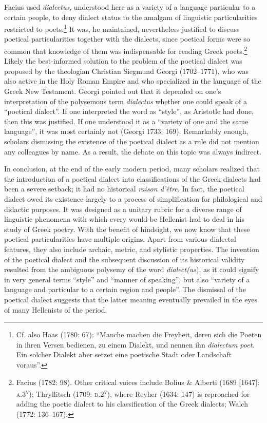 \begin{styleStandard}
Facius used \textit{dialectus}, understood here\textit{ }as\textsc{ }a variety of a language particular to a certain people, to deny dialect status to the amalgam of linguistic particularities restricted to poets.\footnote{ Cf. also Haas (1780: 67): “Manche machen die Freyheit, deren sich die Poeten in ihren Versen bedienen, zu einem Dialekt, und nennen ihn \textit{dialectum poet}. Ein solcher Dialekt aber setzet eine poetische Stadt oder Landschaft voraus”.} It was, he maintained, nevertheless justified to discuss poetical particularities together with the dialects, since poetical forms were so common that knowledge of them was indispensable for reading Greek poets.\footnote{ Facius (1782: 98). Other critical voices include Bolius \& Alberti (1689 [1647]: \textsc{a.3}\textsc{\textsuperscript{v}}); Thryllitsch (1709: \textsc{d.2}\textsc{\textsuperscript{v}}), where Reyher (1634: 147) is reproached for adding the poetic dialect to his classification of the Greek dialects; Walch (1772: 136–167).} Likely the best-informed solution to the problem of the poetical dialect was proposed by the theologian Christian Siegmund Georgi (1702–1771), who was also active in the Holy Roman Empire and who specialized in the language of the Greek New Testament. Georgi pointed out that it depended on one’s interpretation of the polysemous term \textit{dialectus} whether one could speak of a “poetical dialect”. If one interpreted the word as “style”, as Aristotle had done, then this was justified. If one understood it as a “variety of one and the same language”, it was most certainly not (Georgi 1733: 169). Remarkably enough, scholars dismissing the existence of the poetical dialect as a rule did not mention any colleagues by name. As a result, the debate on this topic was always indirect.
\end{styleStandard}

\begin{styleStandard}
In conclusion, at the end of the early modern period, many scholars realized that the introduction of a poetical dialect into classifications of the Greek dialects had been a severe setback; it had no historical \textit{raison d’être}. In fact, the poetical dialect owed its existence largely to a process of simplification for philological and didactic purposes. It was designed as a unitary rubric for a diverse range of linguistic phenomena with which every would-be Hellenist had to deal in his study of Greek poetry. With the benefit of hindsight, we now know that these poetical particularities have multiple origins. Apart from various dialectal features, they also include archaic, metric, and stylistic properties. The invention of the poetical dialect and the subsequent discussion of its historical validity resulted from the ambiguous polysemy of the word \textit{dialect(us}), as it could signify in very general terms “style” and “manner of speaking”, but also “variety of a language and particular to a certain region and people”. The dismissal of the poetical dialect suggests that the latter meaning eventually prevailed in the eyes of many Hellenists of the period.
\end{styleStandard}

